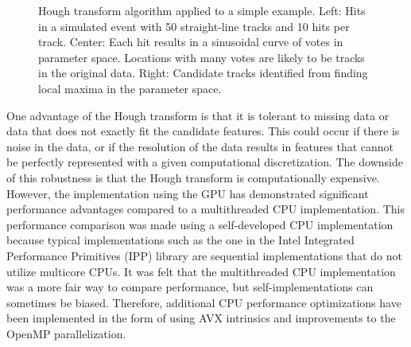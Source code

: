 \documentclass{JINST}
\begin{document}
\begin{figure}[!Hhtb]
\begin{center}
  \caption{Hough transform algorithm applied to a simple example. Left: Hits in a simulated event with 50
    straight-line tracks and 10 hits per track. Center: Each hit results in a sinusoidal curve of votes in parameter
    space. Locations with many votes are likely to be tracks in the original data. Right:
    Candidate tracks identified from finding local maxima in the parameter space.\label{fig:hough}}
\end{center}
\end{figure}

One advantage of the Hough transform is that it is tolerant to missing data or data that does not exactly fit the candidate features.  This could occur if there is noise in the data, or if the resolution of the data results in features that cannot be perfectly represented with a given computational discretization.  The downside of this robustness is that the Hough transform is computationally expensive.  However, the implementation using the GPU has demonstrated significant performance advantages compared to a multithreaded CPU implementation.  This performance comparison was made using a self-developed CPU implementation because typical implementations such as the one in the Intel Integrated Performance Primitives (IPP) library are sequential implementations that do not utilize multicore CPUs.  It was felt that the multithreaded CPU implementation was a more fair way to compare performance, but self-implementations can sometimes be biased.  Therefore, additional CPU performance optimizations have been implemented in the form of using AVX intrinsics and improvements to the OpenMP parallelization.
\end{document}
